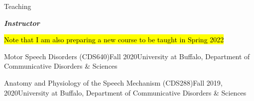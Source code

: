 \documentclass{resume} %
\begin{document}




\begin{rSection}{Teaching}

\begin{center}
	{\bf \emph{Instructor}}
	
	\hl{Note that I am also preparing a new course to be taught in Spring 2022}
\end{center}

	\begin{rSubsection}{Motor Speech Disorders (CDS640)}{Fall 2020}{University at Buffalo, Department of Communicative Disorders \& Sciences}{}
	\end{rSubsection}
	
	\begin{rSubsection}{Anatomy and Physiology of the Speech Mechanism (CDS288)}{Fall 2019, 2020}{University at Buffalo, Department of Communicative Disorders \& Sciences}{}
	\end{rSubsection}


\end{rSection}
\end{document}
